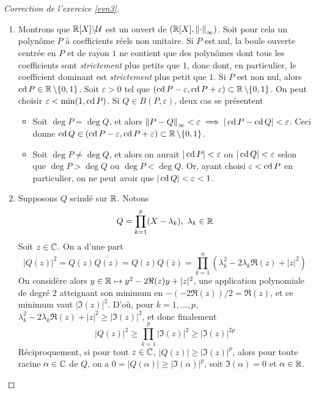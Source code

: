 \begin{proof}[Correction de l'exercice \ref{evn3}]\hfill
    \begin{enumerate}
        \item Montrons que $\operatorname{\mathbb R}[X]\backslash\mathcal U$ est un ouvert de $(\operatorname{\mathbb R}[X],\left\lVert \cdot\right\rVert_\infty)$. 
        Soit pour cela un polynôme $P$ à coefficients réels non unitaire. 
        Si $P$ est nul, la boule ouverte centrée en $P$ et de rayon $1$ ne contient 
        que des polynômes dont tous les coefficients sont \textit{strictement} plus petits que $1$,
        donc dont, en particulier, le coefficient dominant est \textit{strictement} plus petit que $1$.
        Si $P$ est non nul, alors $\operatorname{cd} P\in \operatorname{\mathbb R}\backslash\lbrace 0,1\rbrace$. 
        Soit $\varepsilon > 0$ tel que $(\operatorname{cd} P-\varepsilon,\operatorname{cd} P+\varepsilon)\subset\operatorname{\mathbb R}\backslash\lbrace0,1\rbrace$. 
        On peut choisir $\varepsilon < \min(1,\operatorname{cd} P)$. 
        Si $Q\in B(P,\varepsilon)$, deux cas se présentent 
        \begin{itemize}
            \item Soit $\deg P=\deg Q$, et alors $\left\lVert P-Q\right\rVert_\infty<\varepsilon\implies|\operatorname{cd} P-\operatorname{cd} Q|<\varepsilon$. 
            Ceci donne $\operatorname{cd} Q\in(\operatorname{cd} P-\varepsilon,\operatorname{cd} P+\varepsilon)\subset\operatorname{\mathbb R}\backslash\lbrace0,1\rbrace$.
            \item Soit $\deg P\neq\deg Q$, et alors on aurait $|\operatorname{cd} P|<\varepsilon$ ou $|\operatorname{cd} Q|<\varepsilon$ selon que $\deg P>\deg Q$ ou $\deg P<\deg Q$.
            Or, ayant choisi $\varepsilon < \operatorname{cd} P$ en particulier, on ne peut avoir que $|\operatorname{cd} Q|<\varepsilon<1$.
        \end{itemize}
        \item Supposons $Q$ scindé sur $\operatorname{\mathbb R}$. 
        Notons 
        \[
            Q=\prod_{k=1}^p(X-\lambda_k),\ \lambda_k\in\R  
        \]
        Soit $z\in\operatorname{\mathbb C}$. 
        On a d'une part 
        \[
            |Q(z)|^2=Q(z)\overline{Q(z)}=Q(z)Q(\overline z)=\prod_{k=1}^n(\lambda_k^2-2\lambda_k\Re(z)+|z|^2)    
        \]
        On considère alors $y\in\operatorname{\mathbb R}\mapsto y^2-2\Re(z)y+|z|^2$, une application polynomiale de degré $2$ atteignant son minimum 
        en $-(-2\Re(z))/2=\Re(z)$, et ce minimum vaut $|\Im(z)|^2$.
        D'où, pour $k=1,\dots,p$, $\lambda_k^2-2\lambda_k\Re(z)+|z|^2\geq |\Im(z)|^2$, et donc finalement 
        \[
            |Q(z)|^2\geq\prod_{k=1}^p|\Im(z)|^2\geq|\Im(z)|^{2p}
        \]
        Réciproquement, si pour tout $z\in \operatorname{\mathbb C}$, $|Q(z)|\geq|\Im(z)|^p$, alors pour toute racine $\alpha\in\operatorname{\mathbb C}$ de $Q$,
        on a $0=|Q(\alpha)|\geq|\Im(\alpha)|^p$, soit $\Im(\alpha)=0$ et $\alpha\in\operatorname{\mathbb R}$.


\end{enumerate}
\end{proof}
